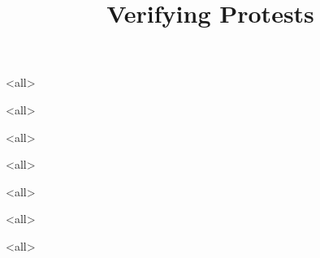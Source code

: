 \title{%
  Verifying Protests
}

\maketitle

\mode*

\begin{abstract}
  
\end{abstract}

\clearpage
\tableofcontents
\clearpage

\mode<all>


\mode<all>


\mode<all>

\mode<all>

\mode<all>


\mode<all>

\mode<all>




\begin{frame}
  \printbibliography{}
\end{frame}
